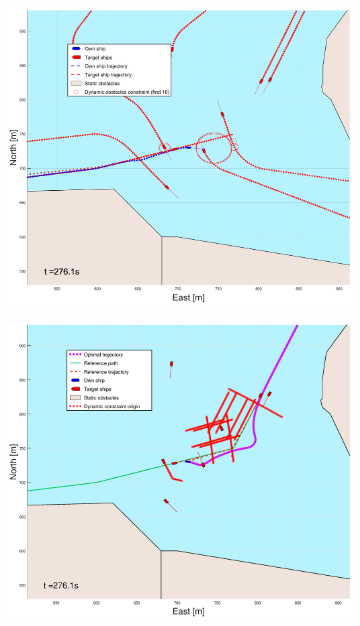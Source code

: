 \begin{figure}[ht]
\begin{subfigure}[b]{0.499\textwidth}
    \end{subfigure}
    \hfill
    \\ 
    \begin{subfigure}[b]{0.49\textwidth}
        \centering
        \includegraphics[width=\textwidth]{Images/Figures/Trheimfjord/_Simple_0fig1_time=276}
    \end{subfigure}
    \hfill
    \begin{subfigure}[b]{0.499\textwidth}
        \centering
        \includegraphics[width=\textwidth]{Images/Figures/Trheimfjord/_Simple_0fig999_time=276}
    \end{subfigure}
    \hfill
\end{figure}
